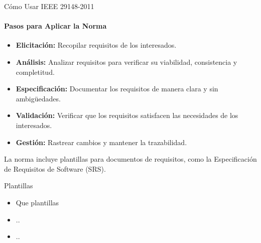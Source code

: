 \documentclass[
  24pt, %
  aspectratio=169, %
]{beamer}
\begin{document}

\begin{frame}{Cómo Usar IEEE 29148-2011}
\framesubtitle{Pasos para Aplicar la Norma}
\begin{itemize}
    \item \textbf{Elicitación:} Recopilar requisitos de los interesados.
    \item \textbf{Análisis:} Analizar requisitos para verificar su viabilidad, consistencia y completitud.
    \item \textbf{Especificación:} Documentar los requisitos de manera clara y sin ambigüedades.
    \item \textbf{Validación:} Verificar que los requisitos satisfacen las necesidades de los interesados.
    \item \textbf{Gestión:} Rastrear cambios y mantener la trazabilidad.
\end{itemize}
La norma incluye plantillas para documentos de requisitos, como la Especificación de Requisitos de Software (SRS).\
\end{frame}

\begin{frame}{Plantillas}
  \begin{itemize}
  \item Que plantillas 
  \item ..
  \item ..
  \end{itemize}
\end{frame}
\end{document}
